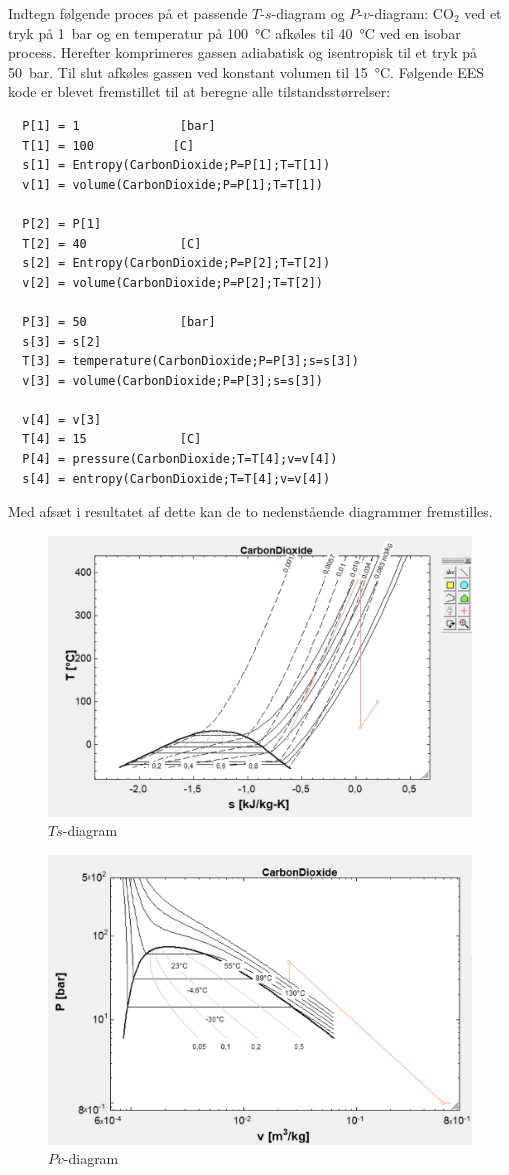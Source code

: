\documentclass[a4paper]{article}
\begin{document}
Indtegn følgende proces på et passende $T$-$s$-diagram og $P$-$v$-diagram: $\mathrm{CO}_2$ ved et tryk på \qty{1}{bar} og en temperatur på \qty{100}{\celsius} afkøles til \qty{40}{\celsius} ved en isobar process. Herefter komprimeres gassen adiabatisk og isentropisk til et tryk på \qty{50}{bar}. Til slut afkøles gassen ved konstant volumen til \qty{15}{\celsius}.
\bigbreak
Følgende EES kode er blevet fremstillet til at beregne alle tilstandsstørrelser:
\begin{verbatim}
  P[1] = 1              [bar]
  T[1] = 100           [C]
  s[1] = Entropy(CarbonDioxide;P=P[1];T=T[1])
  v[1] = volume(CarbonDioxide;P=P[1];T=T[1]) 
 
  P[2] = P[1]
  T[2] = 40             [C]
  s[2] = Entropy(CarbonDioxide;P=P[2];T=T[2])
  v[2] = volume(CarbonDioxide;P=P[2];T=T[2])
 
  P[3] = 50             [bar]
  s[3] = s[2]
  T[3] = temperature(CarbonDioxide;P=P[3];s=s[3])
  v[3] = volume(CarbonDioxide;P=P[3];s=s[3])
 
  v[4] = v[3]
  T[4] = 15             [C]
  P[4] = pressure(CarbonDioxide;T=T[4];v=v[4])
  s[4] = entropy(CarbonDioxide;T=T[4];v=v[4])
\end{verbatim}
Med afsæt i resultatet af dette kan de to nedenstående diagrammer fremstilles. 
\begin{figure} [ht]
  \centering
  \includegraphics[width=0.5\linewidth]{./figures/p1_3.png}
  \caption{$Ts$-diagram}
  \label{fig:p1_3}
\end{figure}

\begin{figure} [ht]
  \centering
  \includegraphics[width=0.5\linewidth]{./figures/p1_4.png}
  \caption{$Pv$-diagram}
  \label{fig:p1_4}
\end{figure}
\end{document}
